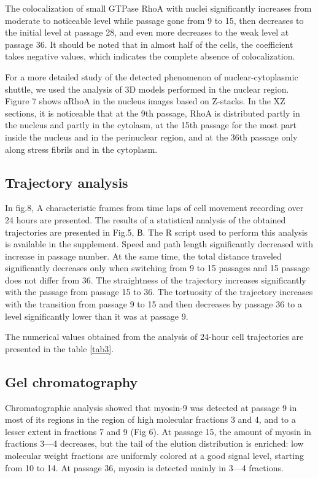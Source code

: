 \documentclass[alpha-refs]{wiley-article}
\begin{document}
The colocalization of small GTPase RhoA with nuclei significantly increases from moderate to noticeable level while passage gone from 9 to 15, then decreases to the initial level at passage 28, and even more decreases to the weak level at passage 36.
It should be noted that in almost half of the cells, the coefficient takes negative values, which indicates the complete absence of colocalization.


For a more detailed study of the detected phenomenon of nuclear-cytoplasmic shuttle, we used the analysis of 3D models performed in the nuclear region.
Figure 7 shows aRhoA in the nucleus images based on Z-stacks.
In the XZ sections, it is noticeable that at the 9th passage, RhoA is distributed partly in the nucleus and partly in the cytolasm, at the 15th passage for the most part inside the nucleus and in the perinuclear region, and at the 36th passage only along stress fibrils and in the cytoplasm.

\subsection{Trajectory analysis}


In fig.8, A characteristic frames from time laps of cell movement recording over 24 hours are presented.
The results of a statistical analysis of the obtained trajectories are presented in Fig.5, В.
The R script used to perform this analysis is available in the supplement.
Speed and path length significantly decreased with increase in passage number.
At the same time, the total distance traveled significantly decreases only when switching from 9 to 15 passages and 15 passage does not differ from 36.
The straightness of the trajectory increases significantly with the passage from passage 15 to 36.
The tortuosity of the trajectory increases with the transition from passage 9 to 15 and then decreases by passage 36 to a level significantly lower than it was at passage 9.


The numerical values obtained from the analysis of 24-hour cell trajectories are presented in the table \ref{tab3}.

\subsection{Gel chromatography}


Chromatographic analysis showed that myosin-9 was detected at passage 9 in most of its regions in the region of high molecular fractions 3 and 4, and to a lesser extent in fractions 7 and 9 (Fig 6).
At passage 15, the amount of myosin in fractions 3–--4 decreases, but the tail of the elution distribution is enriched: low molecular weight fractions are uniformly colored at a good signal level, starting from 10 to 14.
At passage 36, myosin is detected mainly in 3---4 fractions.
\end{document}
